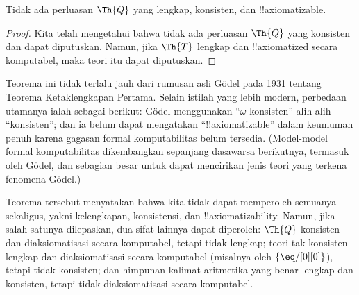 \documentclass[../../../include/open-logic-section]{subfiles}
\begin{document}


\begin{thm}
Tidak ada perluasan $\Th{Q}$ yang lengkap, konsisten, dan
!!{axiomatizable}.
\end{thm}

\begin{proof}
Kita telah mengetahui bahwa tidak ada perluasan $\Th{Q}$ yang konsisten dan
dapat diputuskan. Namun, jika $\Th{T}$ lengkap dan !!{axiomatized} secara
komputabel, maka teori itu dapat diputuskan.
\end{proof}

\begin{explain}
Teorema ini tidak terlalu jauh dari rumusan asli G\"odel pada 1931 tentang
Teorema Ketaklengkapan Pertama. Selain istilah yang lebih modern, perbedaan
utamanya ialah sebagai berikut: G\"odel menggunakan
``$\omega$-konsisten'' alih-alih ``konsisten''; dan ia belum dapat mengatakan
``!!{axiomatizable}'' dalam keumuman penuh karena gagasan formal
komputabilitas belum tersedia. (Model-model formal komputabilitas dikembangkan
sepanjang dasawarsa berikutnya, termasuk oleh G\"odel, dan sebagian besar
untuk dapat mencirikan jenis teori yang terkena fenomena G\"odel.)

Teorema tersebut menyatakan bahwa kita tidak dapat memperoleh semuanya
sekaligus, yakni kelengkapan, konsistensi, dan !!{axiomatizability}. Namun,
jika salah satunya dilepaskan, dua sifat lainnya dapat diperoleh: $\Th{Q}$
konsisten dan diaksiomatisasi secara komputabel, tetapi tidak lengkap; teori
tak konsisten lengkap dan diaksiomatisasi secara komputabel (misalnya oleh
$\{ \eq/[0][0] \}$), tetapi tidak konsisten; dan himpunan kalimat aritmetika
yang benar lengkap dan konsisten, tetapi tidak diaksiomatisasi secara
komputabel.
\end{explain}
\end{document}
